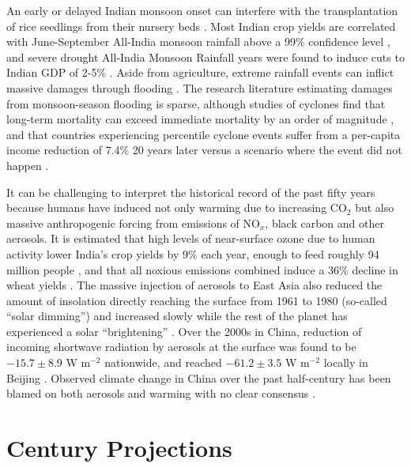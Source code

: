 	An early or delayed Indian monsoon onset can interfere with the transplantation of rice seedlings from their nursery beds \citep{Gadgil2006a}. Most Indian crop yields are correlated with June-September All-India monsoon rainfall above a 99\% confidence level \citep{KrishnaKumar2004}, and severe drought All-India Monsoon Rainfall years were found to induce cuts to Indian GDP of 2-5\% \citep{Gadgil2006}. Aside from agriculture, extreme rainfall events can inflict massive damages through flooding \citep{Li2012}. The research literature estimating damages from monsoon-season flooding is sparse, although studies of cyclones find that long-term mortality can exceed immediate mortality by an order of magnitude \citep{Anttila-Hughes2012}, and that countries experiencing  percentile cyclone events  suffer from a per-capita income reduction of 7.4\% 20 years later versus a scenario where the event did not happen \citep{Hsiang2014}.
	
	It can be challenging to interpret the historical record of the past fifty years because humans have induced not only warming due to increasing CO$_2$ but also massive anthropogenic forcing from emissions of NO$_x$, black carbon and other aerosols. It is estimated that high levels of near-surface ozone due to human activity lower India's crop yields by 9\% each year, enough to feed roughly 94 million people \citep{Ghude2014}, and that all noxious emissions combined induce a 36\% decline in wheat yields \citep{Burney2014}. The massive injection of aerosols to East Asia also reduced the amount of insolation directly reaching the surface from 1961 to 1980 (so-called ``solar dimming'') and increased slowly while the rest of the planet has experienced a solar ``brightening'' \citep{Norris2009}. Over the 2000s in China, reduction of incoming shortwave radiation by aerosols at the surface was found to be $-15.7 \pm 8.9$ W m$^{-2}$ nationwide, and reached $-61.2 \pm 3.5$ W m$^{-2}$ locally in Beijing \citep{Li2010b}. Observed climate change in China over the past half-century has been blamed on both aerosols and warming with no clear consensus \citep{Menon2002,Yang2015,Yu2016,Yang2016}.
	
\section{ Century Projections}

